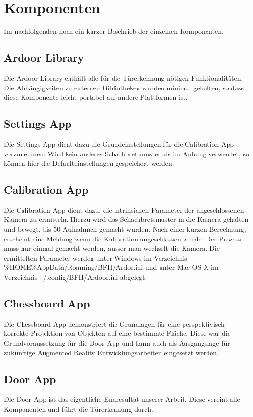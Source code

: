 \chapter{Komponenten}

Im nachfolgenden noch ein kurzer Beschrieb der einzelnen Komponenten.

\section{Ardoor Library}
Die Ardoor Library enthält alle für die Türerkennung nötigen Funktionalitäten. Die Abhängigkeiten zu externen Bibliotheken wurden minimal gehalten, so dass diese Komponente leicht portabel auf andere Plattformen ist.

\section{Settings App}
Die Settings-App dient dazu die Grundeinstellungen für die Calibration App vorzunehmen. Wird kein anderes Schachbrettmuster als im Anhang verwendet, so können hier die Defaulteinstellungen gespeichert werden.

\section{Calibration App}
Die Calibration App dient dazu, die intrinsichen Parameter der angeschlossenen Kamera zu ermitteln. Hierzu wird das Schachbrettmuster in die Kamera gehalten und bewegt, bis 50 Aufnahmen gemacht wurden. Nach einer kurzen Berechnung, erscheint eine Meldung wenn die Kalibration angeschlossen wurde. Der Prozess muss nur einmal gemacht werden, ausser man wechselt die Kamera. Die ermittelten Parameter werden unter Windows im Verzeichnis \%HOME\%AppData/Roaming/BFH/Ardor.ini und unter Mac OS X im Verzeichnis ~/.config/BFH/Ardoor.ini abgelegt.

\section{Chessboard App}
Die Chessboard App demonstriert die Grundlagen für eine perspektivisch korrekte Projektion von Objekten auf eine bestimmte Fläche. Diese war die Grundvoraussetzung für die Door App und kann auch als Ausgangslage für zukünftige Augmented Reality Entwicklungsarbeiten eingesetzt werden.

\section{Door App}
Die Door App ist das eigentliche Endresultat unserer Arbeit. Diese vereint alle Komponenten und führt die Türerkennung durch.
